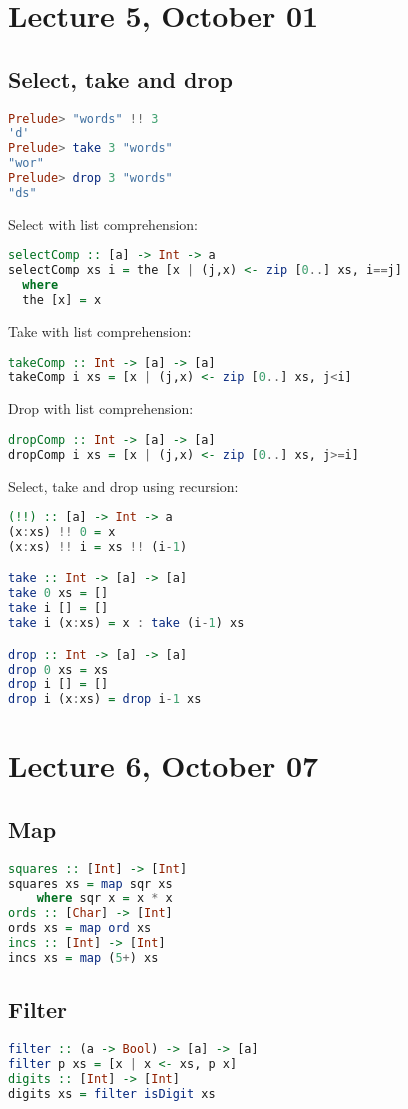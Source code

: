 \documentclass{article}
\begin{document}
\section{Lecture 5, October 01}
\subsection{Select, take and drop}
\begin{lstlisting}[language=haskell]
Prelude> "words" !! 3
'd'
Prelude> take 3 "words"
"wor"
Prelude> drop 3 "words"
"ds"
\end{lstlisting}
Select with list comprehension:
\begin{lstlisting}[language=haskell]
selectComp :: [a] -> Int -> a
selectComp xs i = the [x | (j,x) <- zip [0..] xs, i==j]
  where
  the [x] = x
\end{lstlisting}
Take with list comprehension:
\begin{lstlisting}[language=haskell]
takeComp :: Int -> [a] -> [a]
takeComp i xs = [x | (j,x) <- zip [0..] xs, j<i]
\end{lstlisting}
Drop with list comprehension:
\begin{lstlisting}[language=haskell]
dropComp :: Int -> [a] -> [a]
dropComp i xs = [x | (j,x) <- zip [0..] xs, j>=i]
\end{lstlisting}
Select, take and drop using recursion:
\begin{lstlisting}[language=haskell]
(!!) :: [a] -> Int -> a
(x:xs) !! 0 = x
(x:xs) !! i = xs !! (i-1)

take :: Int -> [a] -> [a]
take 0 xs = []
take i [] = []
take i (x:xs) = x : take (i-1) xs

drop :: Int -> [a] -> [a]
drop 0 xs = xs
drop i [] = []
drop i (x:xs) = drop i-1 xs
\end{lstlisting}
\section{Lecture 6, October 07}
\subsection{Map}
\begin{lstlisting}[language=haskell]
squares :: [Int] -> [Int]
squares xs = map sqr xs
    where sqr x = x * x
ords :: [Char] -> [Int]
ords xs = map ord xs
incs :: [Int] -> [Int]
incs xs = map (5+) xs
\end{lstlisting}
\subsection{Filter}
\begin{lstlisting}[language=haskell]
filter :: (a -> Bool) -> [a] -> [a]
filter p xs = [x | x <- xs, p x]
digits :: [Int] -> [Int]
digits xs = filter isDigit xs
\end{lstlisting}
\end{document}
